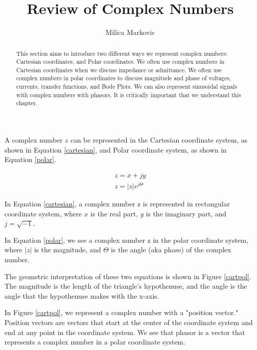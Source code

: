 \documentclass{ximera}
\title{Review of Complex Numbers}
\author{Milica Markovic}
\begin{document}
  
\begin{abstract}  
This section aims to introduce two different ways we represent complex numbers: Cartesian coordinates, and Polar coordinates. We often use complex numbers in Cartesian coordinates when we discuss impedance or admittance. We often use complex numbers in polar coordinates to discuss magnitude and phase of voltages, currents, transfer functions, and Bode Plots. We can also represent sinusoidal signals with complex numbers with phasors. It is critically important that we understand this chapter.
\end{abstract}  
\maketitle    
  
\begin{definition}
 A complex number  $z$ can be represented in the Cartesian coordinate system, as shown in Equation \ref{cartesian}, and  Polar coordinate system, as shown in Equation \ref{polar}.




\begin{eqnarray}
z= x + j y \label{cartesian} \\ 
z=|z| e^{j \Theta} \label{polar}
\end{eqnarray}

\end{definition}

In Equation \ref{cartesian}, a complex number z is represented in rectangular coordinate system, where $x$ is the real part, $y$ is the imaginary part, and $j=\sqrt{-1}$. 

In Equation \ref{polar}, we see a complex number z  in the polar coordinate system, where  $|z|$ is the magnitude, and $\Theta$ is the angle (aka phase) of the complex number.

The geometric interpretation of these two equations is shown in Figure \ref{cartpol}. The magnitude is the length of the triangle's hypothenuse, and the angle is the angle that the hypothenuse makes with the x-axis. 

 In Figure \ref{cartpol}, we  represent a complex number with a "position vector." Position vectors are vectors that start at the center of the coordinate system and end at any point in the coordinate system. We see that phasor is a vector that represents a complex number in a polar coordinate system. 
\end{document}
